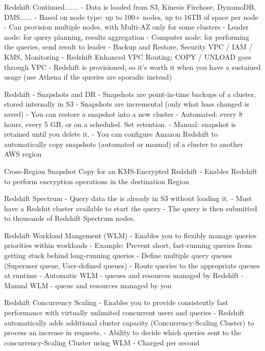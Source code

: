\documentclass[11pt]{book}
\begin{document}
    Redshift Continued.......
    - Data is loaded from S3, Kinesis Firehose, DynamoDB, DMS......
    - Based on node type: up to 100+ nodes, up to 16TB of space per node
    - Can provision multiple nodes, with Multi-AZ only for some clusters
    - Leader node: for query planning, results aggregation
    - Computer node: for performing the queries, send result to leader
    - Backup and Restore, Security VPC / IAM / KMS, Monitoring
    - Redshift Enhanced VPC Routing: COPY / UNLOAD goes through VPC
    - Redshift is provisioned, so it's worth it when you have a sustained usage (use Athena if the queries are sporadic instead)

    Redshift - Snapshots and DR
    - Snapshots are point-in-time backups of a cluster, stored internally in S3
    - Snapshots are incremental (only what hass changed is saved)
    - You can restore a snapshot into a new cluster
    - Automated: every 8 hours, every 5 GB, or on a scheduled. Set retention.
    - Manual: snapshot is retained until you delete it.
    - You can configure Amazon Redshift to automatically copy snapshots (automated or manual) of a cluster to another AWS region

    Cross-Region Snapshot Copy for an KMS-Encrypted Redshift
    - Enables Redshift to perform encryption operations in the destination Region

    Redshift Spectrum
    - Query data the is already in S3 without loading it.
    - Must have a Redshit cluster available to start the query
    - The query is then submitted to thousands of Redshift Spectrum nodes.

    Redshift Workload Mangement (WLM)
    - Enables you to flexibly manage queries priorities within workloads
    - Example: Prevent short, fast-running queries from getting stuck behind long-running queries
    - Define multiple query queues (Superuser queue, User-defined queues)
    - Route queries to the appropriate queues at runtime
    - Automatic WLM - queues and resources managed by Redshift
    - Manual WLM - queue and resources managed by you

    Redshift Concurrency Scaling
    - Enables you to provide consistently fast performance with virtually unlimited concurrent users and queries
    - Redshift automatically adds additional cluster capacity (Concurrency-Scaling Cluster) to process an increase in requests.
    - Ability to decide which queries sent to the concurrency-Scaling Cluster using WLM
    - Charged per second
\end{document}
